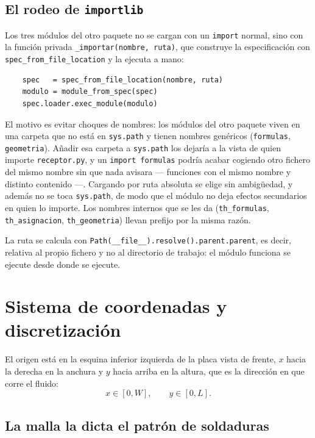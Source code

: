 \documentclass[11pt,a4paper]{article}
\begin{document}
\subsection{El rodeo de \texttt{importlib}}

Los tres módulos del otro paquete no se cargan con un \texttt{import} normal,
sino con la función privada \texttt{\_importar(nombre, ruta)}, que construye la
especificación con \texttt{spec\_from\_file\_location} y la ejecuta a mano:

\begin{verbatim}
    spec   = spec_from_file_location(nombre, ruta)
    modulo = module_from_spec(spec)
    spec.loader.exec_module(modulo)
\end{verbatim}

El motivo es evitar choques de nombres: los módulos del otro paquete viven en
una carpeta que no está en \texttt{sys.path} y tienen nombres genéricos
(\texttt{formulas}, \texttt{geometria}). Añadir esa carpeta a \texttt{sys.path}
los dejaría a la vista de quien importe \texttt{receptor.py}, y un
\texttt{import formulas} podría acabar cogiendo otro fichero del mismo nombre
sin que nada avisara --- funciones con el mismo nombre y distinto contenido ---.
Cargando por ruta absoluta se elige sin ambigüedad, y además no se toca
\texttt{sys.path}, de modo que el módulo no deja efectos secundarios en quien lo
importe. Los nombres internos que se les da
(\texttt{th\_formulas}, \texttt{th\_asignacion}, \texttt{th\_geometria}) llevan
prefijo por la misma razón.

La ruta se calcula con \texttt{Path(\_\_file\_\_).resolve().parent.parent}, es
decir, relativa al propio fichero y no al directorio de trabajo: el módulo
funciona se ejecute desde donde se ejecute.

\section{Sistema de coordenadas y discretización}

El origen está en la esquina inferior izquierda de la placa vista de frente,
$x$ hacia la derecha en la anchura y $y$ hacia arriba en la altura, que es la
dirección en que corre el fluido:
\[
  x \in [0, W], \qquad y \in [0, L].
\]

\subsection{La malla la dicta el patrón de soldaduras}
\end{document}
